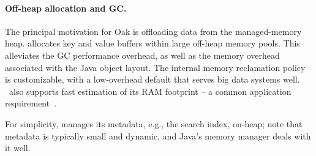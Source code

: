 \paragraph{Off-heap allocation and GC.} 
The principal motivation for Oak is offloading data from the managed-memory heap.
\oak\/ allocates key and value buffers within large off-heap memory pools. This alleviates the 
GC 
performance overhead, as well as the memory overhead associated with the Java object layout.  
{The internal memory reclamation policy is customizable, with a low-overhead default that serves
big data systems well. %
\oak\
also supports fast estimation of its
RAM footprint --  a common application requirement~\cite{HbaseSizeTracking}.}

For simplicity, \oak\/ manages its metadata, e.g., the search index, on-heap; note that metadata is typically
small and dynamic, and Java's memory manager deals with it well.




